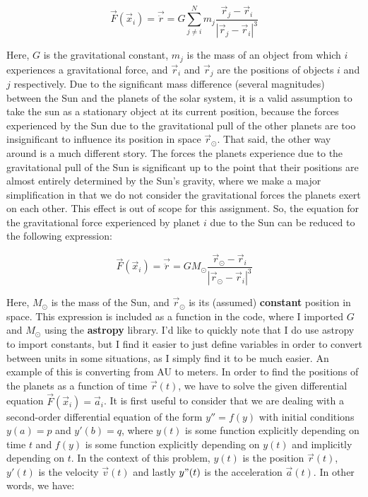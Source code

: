 \begin{equation}
\vec{F}(\vec{x}_i) = \vec{\ddot{r}} = G \sum_{j \neq i}^N m_j \frac{\vec{r}_j - \vec{r}_i}{|\vec{r}_j - \vec{r}_i|^3}
\end{equation}

Here, $G$ is the gravitational constant, $m_j$ is the mass of an object from which $i$ experiences a gravitational force, and $\vec{r}_i$ and $\vec{r}_j$ are the positions of objects $i$ and $j$ respectively. Due to the significant mass difference (several magnitudes) between the Sun and the planets of the solar system, it is a valid assumption to take the sun as a stationary object at its current position, because the forces experienced by the Sun due to the gravitational pull of the other planets are too insignificant to influence its position in space $\vec{r}_{\odot}$. That said, the other way around is a much different story. The forces the planets experience due to the gravitational pull of the Sun is significant up to the point that their positions are almost entirely determined by the Sun's gravity, where we make a major simplification in that we do not consider the gravitational forces the planets exert on each other. This effect is out of scope for this assignment. So, the equation for the gravitational force experienced by planet $i$ due to the Sun can be reduced to the following expression:

\begin{equation}
\vec{F}(\vec{x}_i) = \vec{\ddot{r}} = G M_{\odot} \frac{\vec{r}_{\odot} - \vec{r}_i}{|\vec{r}_{\odot} - \vec{r}_i|^3}
\end{equation}

Here, $M_{\odot}$ is the mass of the Sun, and $\vec{r}_{\odot}$ is its (assumed) \textbf{constant} position in space. This expression is included as a function in the code, where I imported $G$ and $M_{\odot}$ using the \textbf{astropy} library. I'd like to quickly note that I do use astropy to import constants, but I find it easier to just define variables in order to convert between units in some situations, as I simply find it to be much easier. An example of this is converting from AU to meters. In order to find the positions of the planets as a function of time $\vec{r}(t)$, we have to solve the given differential equation $\vec{F}(\vec{x}_i) = \vec{a}_i$. It is first useful to consider that we are dealing with a second-order differential equation of the form $y'' = f(y)$ with initial conditions $y(a) = p$ and $y'(b) = q$, where $y(t)$ is some function explicitly depending on time $t$ and $f(y)$ is some function explicitly depending on $y(t)$ and implicitly depending on $t$. In the context of this problem, $y(t)$ is the position $\vec{r}(t)$, $y'(t)$ is the velocity $\vec{v}(t)$ and lastly $y"(t)$ is the acceleration $\vec{a}(t)$. In other words, we have:

